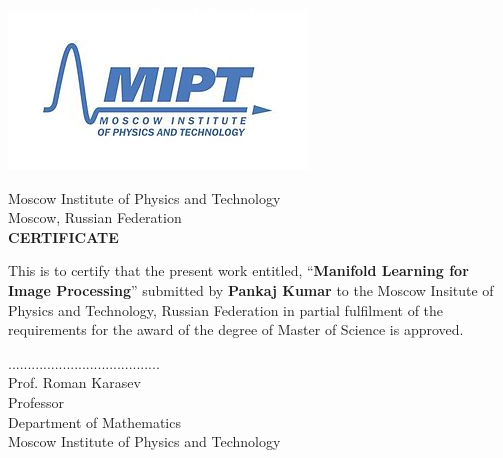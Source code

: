 \documentclass[12pt, oneside]{Thesis} %
\begin{document}
\pagestyle{fancy} %
\begin{center}
\begin{center}
\includegraphics[scale=0.8]{./snulogo.png}
\end{center}
\singlespacing
\singlespacing
\begin{center}

\textmd{Moscow Institute of Physics and Technology}\\
\singlespacing
Moscow, Russian Federation\\
\singlespacing
\singlespacing
\singlespacing
\singlespacing
\textbf{CERTIFICATE\\}
\end{center}
\end{center}
This is to certify that the present work entitled, ``\textbf{Manifold Learning for Image Processing}” submitted by \textbf{Pankaj Kumar} to the Moscow Insitute of Physics and Technology, Russian Federation in partial fulfilment of the requirements for the award of the degree of Master of Science is approved.
\singlespacing
\singlespacing
\singlespacing
\singlespacing
\singlespacing
\singlespacing
\begin{minipage}{.45\linewidth}

\begin{flushleft}                                   

.......................................\\
Prof. Roman Karasev\\
Professor\\
Department of Mathematics\\
Moscow Institute of Physics and Technology \\
\end{flushleft} 
\end{minipage}
\clearpage %

\end{document}
